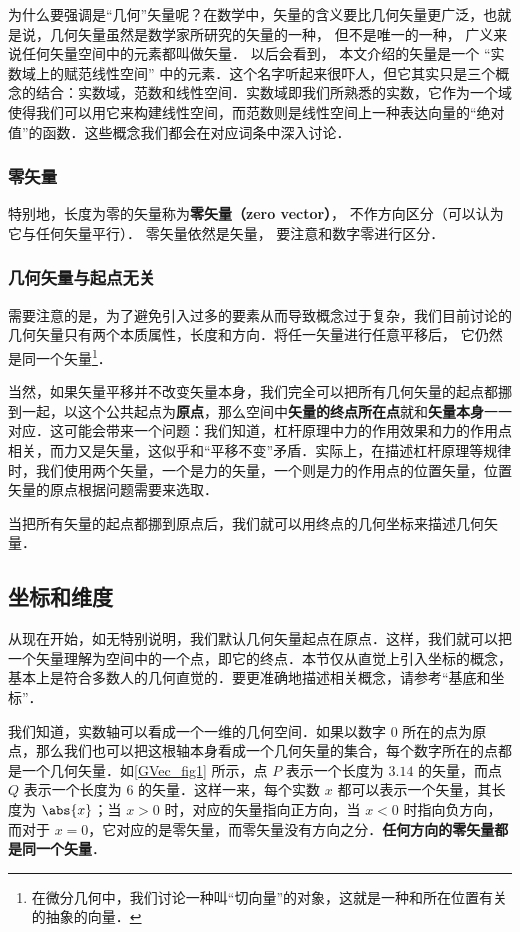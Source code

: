 为什么要强调是“几何”矢量呢？在数学中，矢量的含义要比几何矢量更广泛，也就是说，几何矢量虽然是数学家所研究的矢量的一种， 但不是唯一的一种， 广义来说任何矢量空间中的元素都叫做矢量． 以后会看到， 本文介绍的矢量是一个 “实数域上的赋范线性空间” 中的元素．这个名字听起来很吓人，但它其实只是三个概念的结合：实数域，范数和线性空间．实数域即我们所熟悉的实数，它作为一个域使得我们可以用它来构建线性空间，而范数则是线性空间上一种表达向量的“绝对值”的函数．这些概念我们都会在对应词条中深入讨论．

\subsubsection{零矢量}
特别地，长度为零的矢量称为\textbf{零矢量（zero vector）}， 不作方向区分（可以认为它与任何矢量平行）． 零矢量依然是矢量， 要注意和数字零进行区分．

\subsubsection{几何矢量与起点无关}
需要注意的是，为了避免引入过多的要素从而导致概念过于复杂，我们目前讨论的几何矢量只有两个本质属性，长度和方向．将任一矢量进行任意平移后， 它仍然是同一个矢量\footnote{在微分几何中，我们讨论一种叫“切向量”的对象，这就是一种和所在位置有关的抽象的向量．}．

当然，如果矢量平移并不改变矢量本身，我们完全可以把所有几何矢量的起点都挪到一起，以这个公共起点为\textbf{原点}，那么空间中\textbf{矢量的终点所在点}就和\textbf{矢量本身}一一对应．这可能会带来一个问题：我们知道，杠杆原理中力的作用效果和力的作用点相关，而力又是矢量，这似乎和“平移不变”矛盾．实际上，在描述杠杆原理等规律时，我们使用两个矢量，一个是力的矢量，一个则是力的作用点的位置矢量，位置矢量的原点根据问题需要来选取．

当把所有矢量的起点都挪到原点后，我们就可以用终点的几何坐标来描述几何矢量．

\subsection{坐标和维度}
从现在开始，如无特别说明，我们默认几何矢量起点在原点．这样，我们就可以把一个矢量理解为空间中的一个点，即它的终点．本节仅从直觉上引入坐标的概念，基本上是符合多数人的几何直觉的．要更准确地描述相关概念，请参考“基底和坐标”．

我们知道，实数轴可以看成一个一维的几何空间．如果以数字 $0$ 所在的点为原点，那么我们也可以把这根轴本身看成一个几何矢量的集合，每个数字所在的点都是一个几何矢量．如\autoref{GVec_fig1} 所示，点 $P$ 表示一个长度为 $3.14$ 的矢量，而点 $Q$ 表示一个长度为 $6$ 的矢量．这样一来，每个实数 $x$ 都可以表示一个矢量，其长度为 $\abs{x}$；当 $x>0$ 时，对应的矢量指向正方向，当 $x<0$ 时指向负方向，而对于 $x=0$，它对应的是零矢量，而零矢量没有方向之分．\textbf{任何方向的零矢量都是同一个矢量}．

